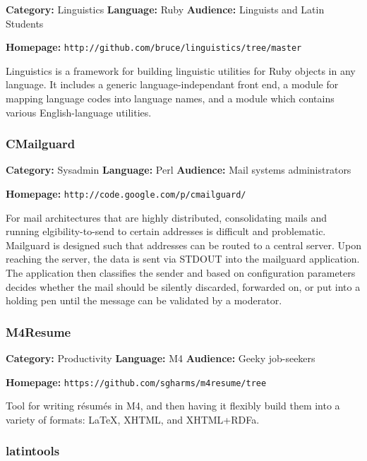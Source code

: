 \documentclass[]{article}
\begin{document}
{\bf Category:} Linguistics  {\bf Language:} Ruby {\bf Audience:} Linguists and Latin Students

{\bf Homepage:} {\tt http://github.com/bruce/linguistics/tree/master}
\vspace{0.05in}

Linguistics is a framework for building linguistic utilities for Ruby objects
in any language. It includes a generic language-independant front end, a
module for mapping language codes into language names, and a module which
contains various English-language utilities.





\subsubsection*{CMailguard}

{\bf Category:} Sysadmin  {\bf Language:} Perl {\bf Audience:} Mail systems administrators

{\bf Homepage:} {\tt http://code.google.com/p/cmailguard/}
\vspace{0.05in}

For mail architectures that are highly distributed, consolidating mails and running elgibility-to-send to certain addresses is difficult and problematic.  Mailguard is designed such that addresses can be routed to a central server. Upon reaching the server, the data is sent via STDOUT into the mailguard application.  The application then classifies the sender and based on configuration parameters decides whether the mail should be silently discarded, forwarded on, or put into a holding pen until the message can be validated by a moderator.




\subsubsection*{M4Resume}

{\bf Category:} Productivity  {\bf Language:} M4 {\bf Audience:} Geeky job-seekers

{\bf Homepage:} {\tt https://github.com/sgharms/m4resume/tree}
\vspace{0.05in}

Tool for writing résumés in M4, and then having it flexibly build them into a variety of formats:  \LaTeX, XHTML, and XHTML+RDFa.




\subsubsection*{latintools}
\end{document}
